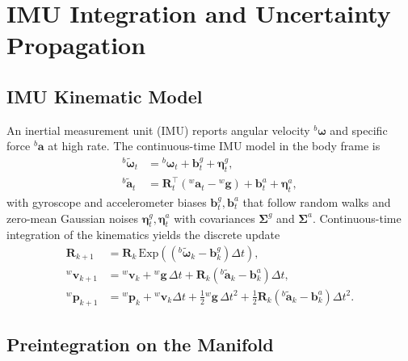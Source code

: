 \section{IMU Integration and Uncertainty Propagation}
\label{sec:ch2_imu_preint}

\subsection{IMU Kinematic Model}
\label{sec:ch2_imu_kinematics}

An inertial measurement unit (IMU) reports angular velocity ${}^{b}\bm{\omega}$ and specific force ${}^{b}\mathbf{a}$ at high rate.
The continuous-time IMU model in the body frame is
\begin{equation}
\label{eq:ch2:imu_model}
\begin{aligned}
{}^{b}\tilde{\bm{\omega}}_t &= {}^{b}\bm{\omega}_t + \mathbf{b}^g_t + \bm{\eta}^g_t,\\
{}^{b}\tilde{\mathbf{a}}_t &= \mathbf{R}_t^{\top}\!\left({}^{w}\mathbf{a}_t - {}^{w}\mathbf{g}\right) + \mathbf{b}^a_t + \bm{\eta}^a_t,
\end{aligned}
\end{equation}
with gyroscope and accelerometer biases $\mathbf{b}^g_t,\mathbf{b}^a_t$ that follow random walks and zero-mean Gaussian noises $\bm{\eta}^g_t,\bm{\eta}^a_t$ with covariances $\bm{\Sigma}^g$ and $\bm{\Sigma}^a$.
Continuous-time integration of the kinematics yields the discrete update
\begin{equation}
\label{eq:ch2:imu_kinematics}
\begin{aligned}
\mathbf{R}_{k+1} &= \mathbf{R}_k \, \mathrm{Exp}\!\left(({}^{b}\tilde{\bm{\omega}}_k - \mathbf{b}^g_k)\Delta t\right),\\
{}^{w}\mathbf{v}_{k+1} &= {}^{w}\mathbf{v}_k + {}^{w}\mathbf{g}\,\Delta t + \mathbf{R}_k({}^{b}\tilde{\mathbf{a}}_k - \mathbf{b}^a_k)\Delta t,\\
{}^{w}\mathbf{p}_{k+1} &= {}^{w}\mathbf{p}_k + {}^{w}\mathbf{v}_k\Delta t + \tfrac{1}{2}{}^{w}\mathbf{g}\,\Delta t^2 + \tfrac{1}{2}\mathbf{R}_k({}^{b}\tilde{\mathbf{a}}_k - \mathbf{b}^a_k)\Delta t^2.
\end{aligned}
\end{equation}

\subsection{Preintegration on the Manifold}
\label{sec:ch2_preint}

